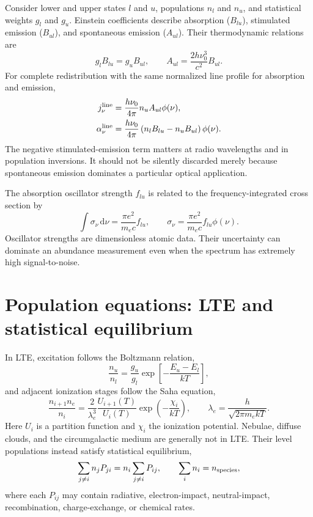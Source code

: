 Consider lower and upper states $l$ and $u$, populations $n_l$ and $n_u$, and
statistical weights $g_l$ and $g_u$.  Einstein coefficients describe absorption
($B_{lu}$), stimulated emission ($B_{ul}$), and spontaneous emission ($A_{ul}$).
Their thermodynamic relations are
\begin{equation}
 g_lB_{lu}=g_uB_{ul},\qquad
 A_{ul}=\frac{2h\nu_0^3}{c^2}B_{ul}.
 \label{eq:einstein-relations}
\end{equation}
For complete redistribution with the same normalized line profile for absorption
and emission,
\begin{align}
 j_\nu^{\rm line} &= \frac{h\nu_0}{4\pi}n_uA_{ul}\phi(\nu),\\
 \alpha_\nu^{\rm line} &= \frac{h\nu_0}{4\pi}
             \left(n_lB_{lu}-n_uB_{ul}\right)\phi(\nu).
 \label{eq:line-j-alpha}
\end{align}
The negative stimulated-emission term matters at radio wavelengths and in population
inversions.  It should not be silently discarded merely because spontaneous emission
dominates a particular optical application.

The absorption oscillator strength $f_{lu}$ is related to the frequency-integrated
cross section by
\begin{equation}
 \int\sigma_\nu\,\mathrm{d}\nu=\frac{\pi e^2}{m_ec}f_{lu},
 \qquad
 \sigma_\nu=\frac{\pi e^2}{m_ec}f_{lu}\phi(\nu).
 \label{eq:oscillator-strength-cross-section}
\end{equation}
Oscillator strengths are dimensionless atomic data.  Their uncertainty can dominate
an abundance measurement even when the spectrum has extremely high signal-to-noise.

\section{Population equations: LTE and statistical equilibrium}

In LTE, excitation follows the Boltzmann relation,
\begin{equation}
 \frac{n_u}{n_l}=\frac{g_u}{g_l}
 \exp\!\left[-\frac{E_u-E_l}{kT}\right],
 \label{eq:boltzmann-populations}
\end{equation}
and adjacent ionization stages follow the Saha equation,
\begin{equation}
 \frac{n_{i+1}n_e}{n_i}=
 \frac{2}{\lambda_e^3}\frac{U_{i+1}(T)}{U_i(T)}
 \exp\!\left(-\frac{\chi_i}{kT}\right),
 \qquad
 \lambda_e=\frac{h}{\sqrt{2\pi m_ekT}}.
 \label{eq:saha}
\end{equation}
Here $U_i$ is a partition function and $\chi_i$ the ionization potential.  Nebulae,
diffuse clouds, and the circumgalactic medium are generally not in LTE.  Their level
populations instead satisfy statistical equilibrium,
\begin{equation}
 \sum_{j\ne i}n_jP_{ji}=n_i\sum_{j\ne i}P_{ij},
 \qquad \sum_i n_i=n_{\rm species},
 \label{eq:statistical-equilibrium}
\end{equation}
where each $P_{ij}$ may contain radiative, electron-impact, neutral-impact,
recombination, charge-exchange, or chemical rates.

